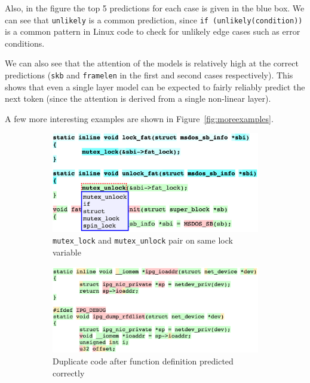 Also, in the figure the top 5 predictions for each case is given in the blue
box. We can see that {\tt unlikely} is a common prediction, since {\tt if
(unlikely(condition))} is a common pattern in Linux code to check for unlikely
edge cases such as error conditions.

We can also see that the attention of the models is relatively high at the
correct predictions ({\tt skb} and {\tt framelen} in the first and second cases
respectively). This shows that even a single layer model can be expected to
fairly reliably predict the next token (since the attention is derived from a
single non-linear layer).

A few more interesting examples are shown in Figure~\ref{fig:moreexamples}.
\begin{figure}
  \centering
\begin{subfigure}{\linewidth}
  \includegraphics[width=\linewidth]{figs/example10.png}
  \caption{{\tt mutex\_lock} and {\tt mutex\_unlock} pair on same lock variable}
  \label{fig:lockunlock}
\end{subfigure}
\begin{subfigure}{\linewidth}
  \includegraphics[width=\linewidth]{figs/example4.png}
  \caption{Duplicate code after function definition predicted correctly}
  \label{fig:duplicate}
\end{subfigure}
\begin{subfigure}{\linewidth}

\end{subfigure}
\end{figure}
